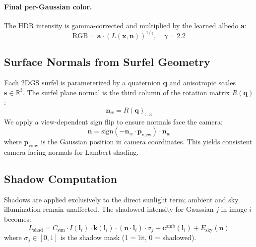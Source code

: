 \documentclass[conference]{IEEEtran}
\begin{document}
\paragraph{Final per-Gaussian color.}
The HDR intensity is gamma-corrected and multiplied by the learned albedo $\mathbf{a}$:
\begin{equation}
    \text{RGB} = \mathbf{a} \cdot \left(L(\mathbf{x}, \mathbf{n})\right)^{1/\gamma}, \quad \gamma = 2.2
    \label{eq:final_color}
\end{equation}

\subsection{Surface Normals from Surfel Geometry}
\label{sec:normals}

Each 2DGS surfel is parameterized by a quaternion $\mathbf{q}$ and anisotropic scales $\mathbf{s} \in \mathbb{R}^3$.
The surfel plane normal is the third column of the rotation matrix $R(\mathbf{q})$:
\begin{equation}
    \mathbf{n}_w = R(\mathbf{q})_{:,3}
\end{equation}
We apply a view-dependent sign flip to ensure normals face the camera:
\begin{equation}
    \mathbf{n} = \text{sign}(-\mathbf{n}_w \cdot \mathbf{p}_{\text{view}}) \cdot \mathbf{n}_w
\end{equation}
where $\mathbf{p}_{\text{view}}$ is the Gaussian position in camera coordinates.
This yields consistent camera-facing normals for Lambert shading.

\subsection{Shadow Computation}
\label{sec:shadows}

Shadows are applied exclusively to the direct sunlight term; ambient and sky illumination remain unaffected.
The shadowed intensity for Gaussian $j$ in image $i$ becomes:
\begin{equation}
    L_{\text{shad}} = C_{\text{sun}} \cdot I(\mathbf{l}_i) \cdot \mathbf{k}(\mathbf{l}_i) \cdot (\mathbf{n}\cdot\mathbf{l}_i) \cdot \sigma_j + \mathbf{c}^{\text{amb}}(\mathbf{l}_i) + E_{\text{sky}}(\mathbf{n})
    \label{eq:shadowed}
\end{equation}
where $\sigma_j \in [0, 1]$ is the shadow mask (1 = lit, 0 = shadowed).
\end{document}
